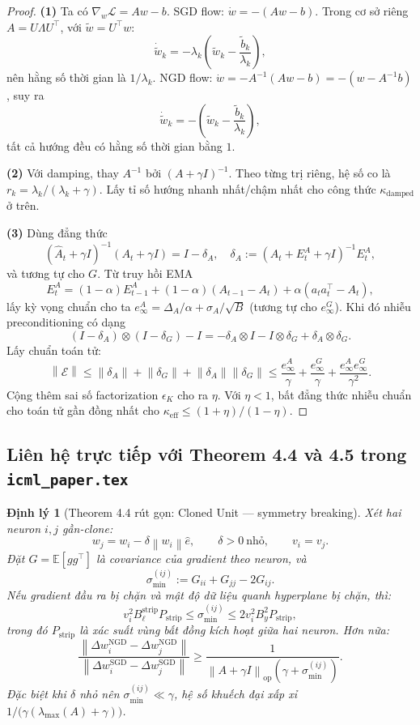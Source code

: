 \documentclass[11pt]{article}
\newcommand{\E}{\mathbb{E}}
\newcommand{\norm}[1]{\left\lVert #1 \right\rVert}
\newtheorem{theorem}[lemma]{Định lý}
\begin{document}
\begin{proof}
\textbf{(1)} Ta có $\nabla_w\mathcal{L}=Aw-b$.
SGD flow: $\dot w=-(Aw-b)$.
Trong cơ sở riêng $A=U\Lambda U^\top$, với $\tilde w=U^\top w$:
\[
\dot{\tilde w}_k
=
-\lambda_k\!\left(\tilde w_k-\frac{\tilde b_k}{\lambda_k}\right),
\]
nên hằng số thời gian là $1/\lambda_k$.
NGD flow: $\dot w=-A^{-1}(Aw-b)=-(w-A^{-1}b)$, suy ra
\[
\dot{\tilde w}_k
=
-\left(\tilde w_k-\frac{\tilde b_k}{\lambda_k}\right),
\]
tất cả hướng đều có hằng số thời gian bằng $1$.

\textbf{(2)} Với damping, thay $A^{-1}$ bởi $(A+\gamma I)^{-1}$.
Theo từng trị riêng, hệ số co là $r_k=\lambda_k/(\lambda_k+\gamma)$.
Lấy tỉ số hướng nhanh nhất/chậm nhất cho công thức $\kappa_{\mathrm{damped}}$ ở trên.

\textbf{(3)} Dùng đẳng thức
\[
(\hat A_t+\gamma I)^{-1}(A_t+\gamma I)
=
I-\delta_A,\quad
\delta_A:=(A_t+E_t^A+\gamma I)^{-1}E_t^A,
\]
và tương tự cho $G$.
Từ truy hồi EMA
\[
E_t^A=(1-\alpha)E_{t-1}^A+(1-\alpha)(A_{t-1}-A_t)+\alpha(a_ta_t^\top-A_t),
\]
lấy kỳ vọng chuẩn cho ta $e_\infty^A=\Delta_A/\alpha+\sigma_A/\sqrt B$ (tương tự cho $e_\infty^G$).
Khi đó nhiễu preconditioning có dạng
\[
(I-\delta_A)\otimes(I-\delta_G)-I
=
-\delta_A\otimes I-I\otimes\delta_G+\delta_A\otimes\delta_G.
\]
Lấy chuẩn toán tử:
\[
\norm{\mathcal E}
\le
\norm{\delta_A}+\norm{\delta_G}+\norm{\delta_A}\norm{\delta_G}
\le
\frac{e_\infty^A}{\gamma}+\frac{e_\infty^G}{\gamma}
+\frac{e_\infty^Ae_\infty^G}{\gamma^2}.
\]
Cộng thêm sai số factorization $\epsilon_K$ cho ra $\eta$.
Với $\eta<1$, bất đẳng thức nhiễu chuẩn cho toán tử gần đồng nhất cho
$\kappa_{\mathrm{eff}}\le(1+\eta)/(1-\eta)$.
\end{proof}

\subsection{Liên hệ trực tiếp với Theorem 4.4 và 4.5 trong \texttt{icml\_paper.tex}}
\begin{theorem}[Theorem 4.4 rút gọn: Cloned Unit --- symmetry breaking]
Xét hai neuron $i,j$ gần-clone:
\[
w_j = w_i - \delta\norm{w_i}\hat e,\qquad \delta>0\ \text{nhỏ},\qquad v_i=v_j.
\]
Đặt $G=\E[gg^\top]$ là covariance của gradient theo neuron, và
\[
\sigma_{\min}^{(ij)} := G_{ii}+G_{jj}-2G_{ij}.
\]
Nếu gradient đầu ra bị chặn và mật độ dữ liệu quanh hyperplane bị chặn, thì:
\[
v_i^2 B_\ell^{\mathrm{strip}} P_{\mathrm{strip}}
\le
\sigma_{\min}^{(ij)}
\le
2v_i^2 B_y^2 P_{\mathrm{strip}},
\]
trong đó $P_{\mathrm{strip}}$ là xác suất vùng bất đồng kích hoạt giữa hai neuron. Hơn nữa:
\[
\frac{\norm{\Delta w_i^{\mathrm{NGD}}-\Delta w_j^{\mathrm{NGD}}}}
{\norm{\Delta w_i^{\mathrm{SGD}}-\Delta w_j^{\mathrm{SGD}}}}
\ge
\frac{1}{\norm{A+\gamma I}_{\mathrm{op}}(\gamma+\sigma_{\min}^{(ij)})}.
\]
Đặc biệt khi $\delta$ nhỏ nên $\sigma_{\min}^{(ij)}\ll\gamma$, hệ số khuếch đại xấp xỉ
$1/\!\big(\gamma(\lambda_{\max}(A)+\gamma)\big)$.
\end{theorem}
\end{document}
